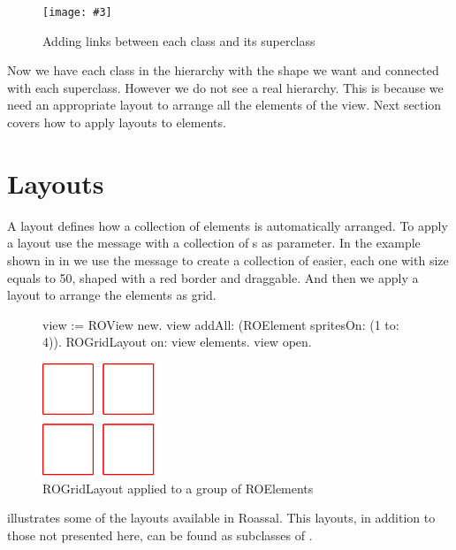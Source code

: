 \documentclass[a4paper,10pt,twoside]{book}
\newcommand{\fig}[4]{
		\begin{figure}[#1]
			\centering
			\texttt{[image: \#3]}
			\caption{\label{fig:#3}#4}
		\end{figure}}
\begin{document}
\fig{H}{0.6}{hier3}{Adding links between each class and its superclass}

Now we have each class in the  hierarchy with the shape we want and connected with each superclass. However we do not see a real hierarchy. This is because we need an appropriate layout to arrange all the elements of the view. Next section covers how to apply layouts to elements.


\section{Layouts} 
A layout defines how a collection of elements is automatically arranged. To apply a layout use the  message with a collection of s as parameter. In the example shown in in  we use the  message to create a collection of  easier, each one with size equals to 50, shaped with a red border and draggable. And then we apply a layout to arrange the elements as grid.


\begin{figure}[H]
\label{fig:primerLayout}
      \begin{minipage}[t]{0.55\textwidth}
      \vspace{0pt}
     \begin{code}{}
view := ROView new.
view addAll: (ROElement spritesOn: (1 to: 4)).
ROGridLayout on: view elements.
view open.
  \end{code}
   \end{minipage}
   \hfill
   \begin{minipage}[t]{0.6\textwidth}
      \vspace{0pt} \raggedright
       \centering
		\includegraphics[width=0.3\textwidth]{ROGrid2} %
   \end{minipage}

\caption{ROGridLayout applied to a group of ROElements}
\end{figure} 

 illustrates some of the layouts available in Roassal. This layouts, in addition to those not presented here, can be found as subclasses of .
\end{document}
